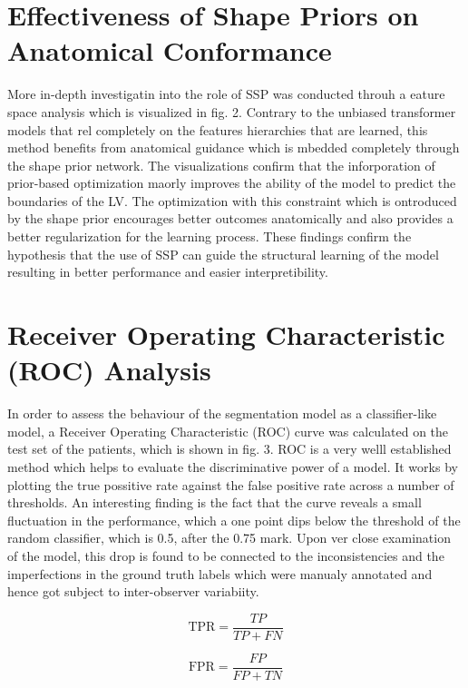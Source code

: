\section{Effectiveness of Shape Priors on Anatomical Conformance}
More in-depth investigatin into the role of SSP was conducted throuh a eature space analysis which is visualized in fig. 2. Contrary to the unbiased transformer models that rel completely on the features hierarchies that are learned, this method benefits from anatomical guidance which is mbedded completely through the shape prior network. The visualizations confirm that the inforporation of prior-based optimization maorly improves the ability of the model to predict the boundaries of the LV. The optimization with this constraint which is ontroduced by the shape prior encourages better outcomes anatomically and also provides a better regularization for the learning process. These findings confirm the hypothesis that the use of SSP can guide the structural learning of the model resulting in better performance and easier interpretibility.

\section{Receiver Operating Characteristic (ROC) Analysis}
In order to assess the behaviour of the segmentation model as a classifier-like model, a Receiver Operating Characteristic (ROC) curve was calculated on the test set of the patients, which is shown in fig. 3. ROC is a very welll established method which helps to evaluate the discriminative power of a model. It works by plotting the true possitive rate against the false positive rate across a number of thresholds. An interesting finding is the fact that the curve reveals a small fluctuation in the performance, which a one point dips below the threshold of the random classifier, which is 0.5, after the 0.75 mark. Upon ver close examination of the model, this drop is found to be connected to the  inconsistencies and the imperfections in the ground truth labels which were manualy annotated and hence got subject to inter-observer variabiity.

\begin{equation}
    \text{TPR} = \frac{TP}{TP + FN}
\end{equation}
    
\begin{equation}
    \text{FPR} = \frac{FP}{FP + TN}
\end{equation}

